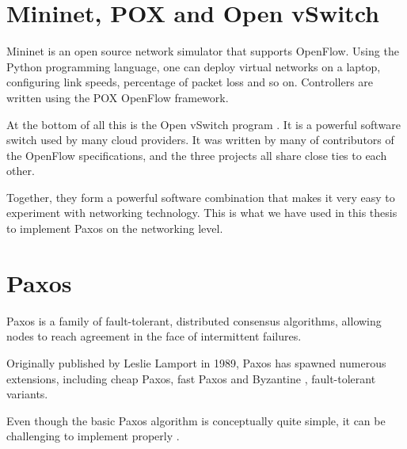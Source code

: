 \section{Mininet, POX and Open vSwitch}
\label{chapter:mininet}

Mininet \cite{github:mininet} is an open source network simulator that
supports OpenFlow.
%
Using the Python programming language, one can deploy virtual networks on a
laptop, configuring link speeds, percentage of packet loss and so on.
%
Controllers are written using the POX \cite{github:pox} OpenFlow framework.

At the bottom of all this is the Open vSwitch program \cite{github:ovs}.
It is a powerful software switch used by many cloud providers.  It was
written by many of contributors of the OpenFlow specifications, and the
three projects all share close ties to each other.

Together, they form a powerful software combination that makes it very easy
to experiment with networking technology.
%
This is what we have used in this thesis to implement Paxos on the
networking level.

\section{Paxos}
\label{chapter:background.paxos}

Paxos \cite{Lam01, Lamport:1998:PP:279227.279229} is a family of
fault-tolerant, distributed consensus algorithms, allowing nodes to reach
agreement in the face of intermittent failures.

Originally published by Leslie Lamport in 1989, Paxos
has spawned numerous extensions, including cheap Paxos,
 fast Paxos
 and Byzantine
, fault-tolerant variants.

Even though the basic Paxos algorithm is conceptually quite simple, it can
be challenging to implement properly \cite{Chandra:2007:PML:1281100.1281103}.

